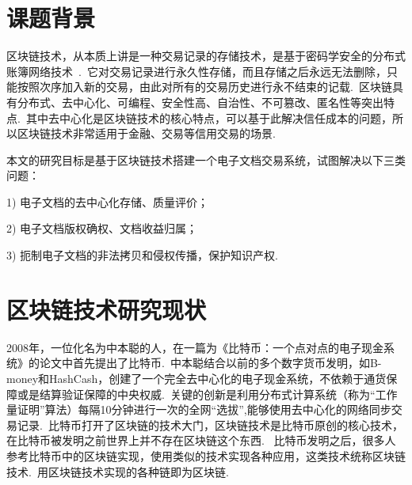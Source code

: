 \documentclass[a4paper,12pt,titlepage]{ctexart}
\begin{document}
\section{课题背景}
区块链技术，从本质上讲是一种交易记录的存储技术，是基于密码学安全的分布式账簿网络技术~\cite{pa}.~它对交易记录进行永久性存储，而且存储之后永远无法删除，只能按照次序加入新的交易，由此对所有的交易历史进行永不结束的记载.~区块链具有分布式、去中心化、可编程、安全性高、自治性、不可篡改、匿名性等突出特点.~其中去中心化是区块链技术的核心特点，可以基于此解决信任成本的问题，所以区块链技术非常适用于金融、交易等信用交易的场景.~\par
本文的研究目标是基于区块链技术搭建一个电子文档交易系统，试图解决以下三类问题：\par
1)	电子文档的去中心化存储、质量评价；\par
2)	电子文档版权确权、文档收益归属；\par
3)	扼制电子文档的非法拷贝和侵权传播，保护知识产权.~\par


\section{区块链技术研究现状}
2008年，一位化名为中本聪的人，在一篇为《比特币：一个点对点的电子现金系统》的论文中首先提出了比特币.~中本聪结合以前的多个数字货币发明，如B-money和HashCash，创建了一个完全去中心化的电子现金系统，不依赖于通货保障或是结算验证保障的中央权威.~关键的创新是利用分布式计算系统（称为“工作量证明”算法）每隔10分钟进行一次的全网“选拔”,能够使用去中心化的网络同步交易记录.~比特币打开了区块链的技术大门，区块链技术是比特币原创的核心技术，在比特币被发明之前世界上并不存在区块链这个东西.~ 比特币发明之后，很多人参考比特币中的区块链实现，使用类似的技术实现各种应用，这类技术统称区块链技术.~用区块链技术实现的各种链即为区块链.~
\end{document}

